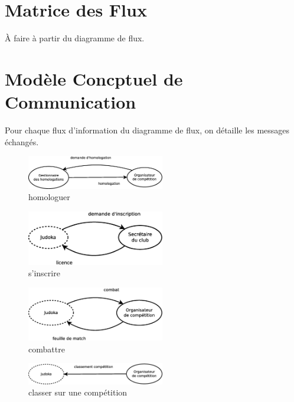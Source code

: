\section*{Matrice des Flux}

À faire à partir du diagramme de flux.

\newpage
\section*{Modèle Concptuel de Communication}

Pour chaque flux d'information du diagramme de flux, on détaille les messages échangés.

\begin{figure}[!htb]
    \begin{center}
    \includegraphics[width=6cm]{images/cc2_mcc5.eps}
    \caption{\label{cc2_mcc5} homologuer}
    \end{center}
\end{figure}

\begin{figure}[!htb]
    \begin{center}
    \includegraphics[width=6cm]{images/cc2_mcc1.eps}
    \caption{\label{cc2_mcc2} s'inscrire}
    \end{center}
\end{figure}

\begin{figure}[!htb]
    \begin{center}
    \includegraphics[width=6cm]{images/cc2_mcc2.eps}
    \caption{\label{cc2_mcc2} combattre}
    \end{center}
\end{figure}

\begin{figure}[!htb]
    \begin{center}
    \includegraphics[width=6cm]{images/cc2_mcc3.eps}
    \caption{\label{cc2_mcc3} classer sur une compétition}
    \end{center}
\end{figure}

